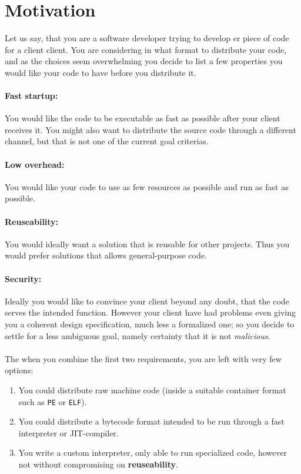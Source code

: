 \section{Motivation}

Let us say, that you are a software developer trying to develop er piece of code
for a client client. You are considering in what format to distribute your code,
and as the choices seem overwhelming you decide to list a few properties you
would like your code to have before you distribute it.

\paragraph{Fast startup:} You would like the code to be executable as fast as
possible after your client receives it. You might also want to distribute the
source code through a different channel, but that is not one of the current goal
criterias.

\paragraph{Low overhead:} You would like your code to use as few resources as
possible and run as fast as possible.

\paragraph{Reuseability:} You would ideally want a solution that is reusable for
other projects. Thus you would prefer solutions that allows general-purpose
code.

\paragraph{Security:} Ideally you would like to convince your client beyond any
doubt, that the code serves the intended function. However your client have had
problems even giving you a coherent design specification, much less a formalized
one; so you decide to settle for a less ambiguous goal, namely certainty that it
is not \emph{malicious}.

\paragraph{}
The when you combine the first two requirements, you are left with very few
options:

\begin{enumerate}
\item You could distribute raw machine code (inside a suitable container format
  such as \texttt{PE} or \texttt{ELF}).
\item You could distribute a bytecode format intended to be run through a fast
  interpreter or JIT-compiler.
\item You write a custom interpreter, only able to run specialized code, however
  not without compromising on \textbf{reuseability}.
\end{enumerate}

